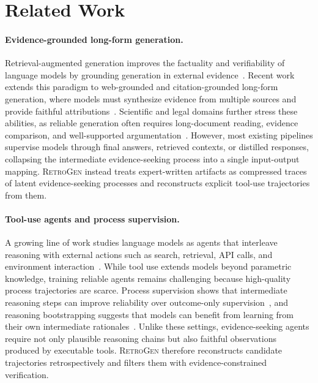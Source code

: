 \section{Related Work}

\paragraph{Evidence-grounded long-form generation.}
Retrieval-augmented generation improves the factuality and verifiability of language models by grounding generation in external evidence~\citep{lewis2020retrieval}. Recent work extends this paradigm to web-grounded and citation-grounded long-form generation, where models must synthesize evidence from multiple sources and provide faithful attributions~\citep{liu2023webglm,qin2023webcpm,gao2023enabling}. Scientific and legal domains further stress these abilities, as reliable generation often requires long-document reading, evidence comparison, and well-supported argumentation~\citep{openscholar,mcdonald2022detect,guha2023legalbench,dai2025laiw}. However, most existing pipelines supervise models through final answers, retrieved contexts, or distilled responses, collapsing the intermediate evidence-seeking process into a single input-output mapping. \textsc{RetroGen} instead treats expert-written artifacts as compressed traces of latent evidence-seeking processes and reconstructs explicit tool-use trajectories from them.

\paragraph{Tool-use agents and process supervision.}
A growing line of work studies language models as agents that interleave reasoning with external actions such as search, retrieval, API calls, and environment interaction~\citep{wang2024survey,yao2022react,qin2024toolllm}. While tool use extends models beyond parametric knowledge, training reliable agents remains challenging because high-quality process trajectories are scarce. Process supervision shows that intermediate reasoning steps can improve reliability over outcome-only supervision~\citep{lightman2024let}, and reasoning bootstrapping suggests that models can benefit from learning from their own intermediate rationales~\citep{zelikman2022star,shao2024deepseekmath}. Unlike these settings, evidence-seeking agents require not only plausible reasoning chains but also faithful observations produced by executable tools. \textsc{RetroGen} therefore reconstructs candidate trajectories retrospectively and filters them with evidence-constrained verification.

